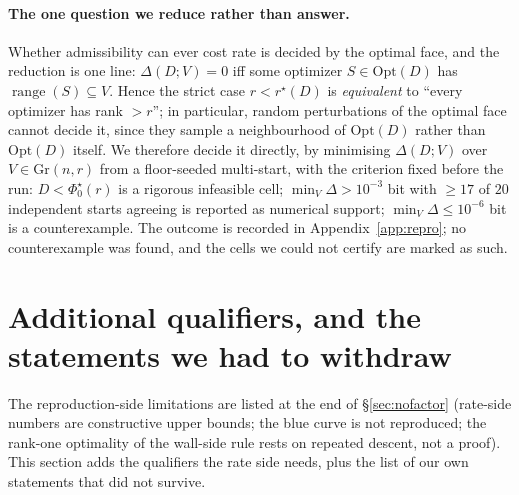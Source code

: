 \documentclass[journal]{IEEEtran}
\theoremstyle{remark}
\begin{document}
\paragraph{The one question we reduce rather than answer.} Whether admissibility
can ever cost rate is decided by the optimal face, and the reduction is one line:
$\Delta(D;V)=0$ iff some optimizer $S\in\mathrm{Opt}(D)$ has
$\operatorname{range}(S)\subseteq V$. Hence the strict case $r<r^{\star}(D)$ is
\emph{equivalent} to ``every optimizer has rank $>r$''; in particular, random
perturbations of the optimal face cannot decide it, since they sample a
neighbourhood of $\mathrm{Opt}(D)$ rather than $\mathrm{Opt}(D)$ itself. We
therefore decide it directly, by minimising $\Delta(D;V)$ over
$V\in\mathrm{Gr}(n,r)$ from a floor-seeded multi-start, with the criterion fixed
before the run: $D<\Phi_0^{\star}(r)$ is a rigorous infeasible cell;
$\min_V\Delta>10^{-3}$ bit with $\ge17$ of $20$ independent starts agreeing is
reported as numerical support; $\min_V\Delta\le10^{-6}$ bit is a counterexample.
The outcome is recorded in Appendix~\ref{app:repro}; no counterexample was found,
and the cells we could not certify are marked as such.
\section{Additional qualifiers, and the statements we had to withdraw}\label{sec:qual}

The reproduction-side limitations are listed at the end of \S\ref{sec:nofactor}
(rate-side numbers are constructive upper bounds; the blue curve is not
reproduced; the rank-one optimality of the wall-side rule rests on repeated
descent, not a proof). This section adds the qualifiers the rate side needs, plus
the list of our own statements that did not survive.
\end{document}
